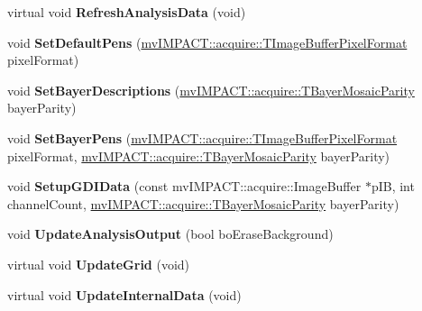 \begin{DoxyCompactItemize}
\item 
\hypertarget{class_plot_canvas_image_analysis_a11b1a4cee17e04d938b426b8fd14b97a}{virtual void {\bfseries Refresh\+Analysis\+Data} (void)}\label{class_plot_canvas_image_analysis_a11b1a4cee17e04d938b426b8fd14b97a}

\item 
\hypertarget{class_plot_canvas_image_analysis_a4c87fedc65d95593746b934cecd2b6df}{void {\bfseries Set\+Default\+Pens} (\hyperlink{group___common_interface_ga456e8aa76e06bb761f27c52141475985}{mv\+I\+M\+P\+A\+C\+T\+::acquire\+::\+T\+Image\+Buffer\+Pixel\+Format} pixel\+Format)}\label{class_plot_canvas_image_analysis_a4c87fedc65d95593746b934cecd2b6df}

\item 
\hypertarget{class_plot_canvas_image_analysis_a0381eeb3669719a4749f6b0b9be9dad3}{void {\bfseries Set\+Bayer\+Descriptions} (\hyperlink{group___common_interface_ga9e2a1b46f3ed21b46b867c6d88d25598}{mv\+I\+M\+P\+A\+C\+T\+::acquire\+::\+T\+Bayer\+Mosaic\+Parity} bayer\+Parity)}\label{class_plot_canvas_image_analysis_a0381eeb3669719a4749f6b0b9be9dad3}

\item 
\hypertarget{class_plot_canvas_image_analysis_a6f5fc0b5cc5368790c6563cc1cb975ae}{void {\bfseries Set\+Bayer\+Pens} (\hyperlink{group___common_interface_ga456e8aa76e06bb761f27c52141475985}{mv\+I\+M\+P\+A\+C\+T\+::acquire\+::\+T\+Image\+Buffer\+Pixel\+Format} pixel\+Format, \hyperlink{group___common_interface_ga9e2a1b46f3ed21b46b867c6d88d25598}{mv\+I\+M\+P\+A\+C\+T\+::acquire\+::\+T\+Bayer\+Mosaic\+Parity} bayer\+Parity)}\label{class_plot_canvas_image_analysis_a6f5fc0b5cc5368790c6563cc1cb975ae}

\item 
\hypertarget{class_plot_canvas_image_analysis_a49b5e6ea717ee59fecd6102f82dcb2e4}{void {\bfseries Setup\+G\+D\+I\+Data} (const mv\+I\+M\+P\+A\+C\+T\+::acquire\+::\+Image\+Buffer $\ast$p\+I\+B, int channel\+Count, \hyperlink{group___common_interface_ga9e2a1b46f3ed21b46b867c6d88d25598}{mv\+I\+M\+P\+A\+C\+T\+::acquire\+::\+T\+Bayer\+Mosaic\+Parity} bayer\+Parity)}\label{class_plot_canvas_image_analysis_a49b5e6ea717ee59fecd6102f82dcb2e4}

\item 
\hypertarget{class_plot_canvas_image_analysis_a43fa290ebedb903e30345f2e0f4269a7}{void {\bfseries Update\+Analysis\+Output} (bool bo\+Erase\+Background)}\label{class_plot_canvas_image_analysis_a43fa290ebedb903e30345f2e0f4269a7}

\item 
\hypertarget{class_plot_canvas_image_analysis_a2fafef720a7146ba8dbaef0c8c7ba9f6}{virtual void {\bfseries Update\+Grid} (void)}\label{class_plot_canvas_image_analysis_a2fafef720a7146ba8dbaef0c8c7ba9f6}

\item 
\hypertarget{class_plot_canvas_image_analysis_a5b0327704354652459604acf2ee01fea}{virtual void {\bfseries Update\+Internal\+Data} (void)}\label{class_plot_canvas_image_analysis_a5b0327704354652459604acf2ee01fea}

\end{DoxyCompactItemize}

